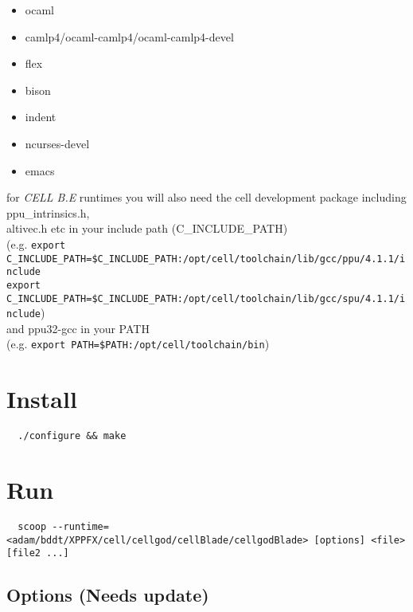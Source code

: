 \documentclass[letterpaper]{article}
\begin{document}
\begin{itemize}
  \setlength{\itemsep}{1pt}
  \setlength{\parskip}{0pt}
  \setlength{\parsep}{0pt}
  \item ocaml
  \item camlp4/ocaml-camlp4/ocaml-camlp4-devel
  \item flex
  \item bison
  \item indent
  \item ncurses-devel
  \item emacs
\end{itemize}

\begin{tabbing}
for \emph{CELL B.E} runtimes you will also need the cell development package
including ppu\_intrinsics.h,\\ altivec.h etc in your include path
(C\_INCLUDE\_PATH)\\
  (e.g. \=\verb!export C_INCLUDE_PATH=$C_INCLUDE_PATH:/opt/cell/toolchain/lib/gcc/ppu/4.1.1/include!\\
   \>\verb!export C_INCLUDE_PATH=$C_INCLUDE_PATH:/opt/cell/toolchain/lib/gcc/spu/4.1.1/include!)\\
  and ppu32-gcc in your PATH\\
  (e.g. \verb!export PATH=$PATH:/opt/cell/toolchain/bin!)\\
\end{tabbing}

\section{Install}

  \verb!  ./configure && make!

\section{Run}

  \verb!  scoop --runtime=<adam/bddt/XPPFX/cell/cellgod/cellBlade/cellgodBlade> [options] <file> [file2 ...]!

\subsection{Options (Needs update)}
\end{document}
